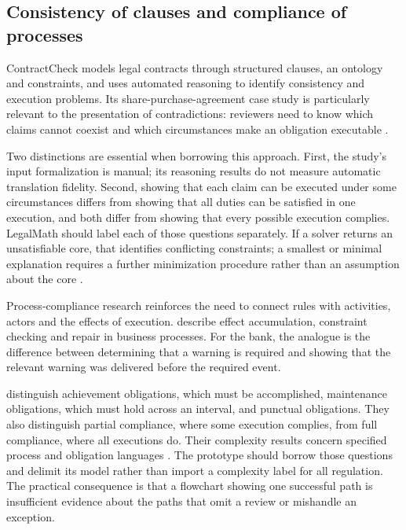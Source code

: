 

\subsection{Consistency of clauses and compliance of processes}

ContractCheck models legal contracts through structured clauses, an ontology and
constraints, and uses automated reasoning to identify consistency and execution
problems. Its share-purchase-agreement case study is particularly relevant to
the presentation of contradictions: reviewers need to know which claims cannot
coexist and which circumstances make an obligation executable
\citep[secs.~3--7]{contractcheck2025}.

Two distinctions are essential when borrowing this approach. First, the study's
input formalization is manual; its reasoning results do not measure automatic
translation fidelity. Second, showing that each claim can be executed under
some circumstances differs from showing that all duties can be satisfied in one
execution, and both differ from showing that every possible execution complies.
LegalMath should label each of those questions separately. If a solver returns
an unsatisfiable core, that identifies conflicting constraints; a smallest or
minimal explanation requires a further minimization procedure rather than an
assumption about the core \citep[secs.~4--5, 8]{contractcheck2025}.

Process-compliance research reinforces the need to connect rules with activities,
actors and the effects of execution. \citet{ghose2007} describe effect accumulation,
constraint checking and repair in business processes. For the bank, the analogue
is the difference between determining that a warning is required and showing
that the relevant warning was delivered before the required event.

\citet[sec.~2]{compliancehard2015} distinguish achievement obligations, which must
be accomplished, maintenance obligations, which must hold across an interval,
and punctual obligations. They also distinguish partial compliance, where some
execution complies, from full compliance, where all executions do. Their
complexity results concern specified process and obligation languages
\citep[secs.~3--4]{compliancehard2015}. The prototype should borrow those questions
and delimit its model rather than import a complexity label for all regulation.
The practical consequence is that a flowchart showing one successful path is
insufficient evidence about the paths that omit a review or mishandle an exception.

